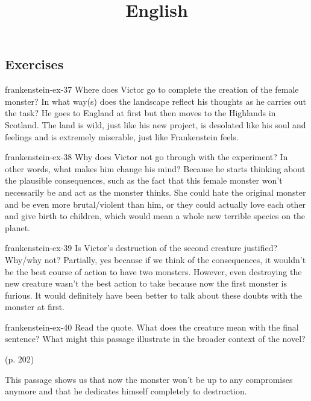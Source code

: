 \documentclass[preview]{standalone}
\begin{document}
\title{English}
\genpage

\subsection{Exercises}

\begin{snippetexercise}{frankenstein-ex-37}
    {Where does Victor go to complete the creation of the female monster? In what way(s) does the
    landscape reflect his thoughts as he carries out the task?}
    He goes to England at first but then moves to the Highlands in Scotland.
    The land is wild, just like his new project, is desolated like his soul
    and feelings and is extremely miserable, just like Frankenstein feels.
\end{snippetexercise}

\begin{snippetexercise}{frankenstein-ex-38}
    {Why does Victor not go through with the experiment? In other words, what makes him change
    his mind?}
    Because he starts thinking about the plausible consequences, such as the fact
    that this female monster won't necessarily be and act as the monster thinks.
    She could hate the original monster and be even more brutal/violent than him,
    or they could actually love each other and give birth to children, which
    would mean a whole new terrible species on the planet.
\end{snippetexercise}

\begin{snippetexercise}{frankenstein-ex-39}
    {Is Victor's destruction of the second creature justified? Why/why not?}
    Partially, yes because if we think of the consequences, it wouldn't be the best
    course of action to have two monsters. However, even destroying the new creature
    wasn't the best action to take because now the first monster is furious.
    It would definitely have been better to talk about these doubts with the monster
    at first. 
\end{snippetexercise}

\begin{snippetexercise}{frankenstein-ex-40}
    {Read the quote. What does the creature mean with the final sentence? What might this passage
    illustrate in the broader context of the novel?}
    \begin{center}
         (p. 202)
    \end{center}
    This passage shows us that now the monster won't be up to any compromises
    anymore and that he dedicates himself completely to destruction.
\end{snippetexercise}
\end{document}
